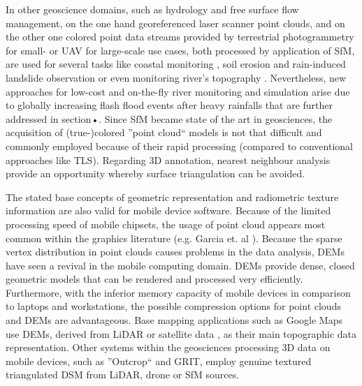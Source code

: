 \documentclass[review]{elsarticle}
\begin{document}
In other geoscience domains, such as hydrology and free surface flow management, on the one hand georeferenced laser scanner point clouds, and on the other one colored point data streams provided by terrestrial photogrammetry for small- or \gls{UAV} for large-scale use cases, both processed by application of \gls{SfM}, are used for several tasks like coastal monitoring \cite{Letortu2017, Medjkane2018}, soil erosion and rain-induced landslide observation or even monitoring river's topography \cite{Watanabe2016}. Nevertheless, new approaches for low-cost and on-the-fly river monitoring \cite{Kroehnert2017a} and simulation \cite{Leskens2015} arise due to globally increasing flash flood events after heavy rainfalls \cite{Mueller2011} that are further addressed in section{•}.
Since \gls{SfM} became state of the art in geosciences, the acquisition of (true-)colored ''point cloud`` models is not that difficult and commonly employed because of their rapid processing (compared to conventional approaches like \gls{TLS}). Regarding 3D annotation, nearest neighbour analysis provide an opportunity whereby surface triangulation can be avoided.








The stated base concepts of geometric representation and radiometric texture information are also valid for mobile device software. Because of the limited processing speed of mobile chipsets, the usage of point cloud appears most common within the graphics literature (e.g. Garcia et. al \cite{Garcia2015}). Because the sparse vertex distribution in point clouds causes problems in the data analysis, \glspl{DEM} have seen a revival in the mobile computing domain. \Glspl{DEM} provide dense, closed geometric models that can be rendered and processed very efficiently. Furthermore, with the inferior memory capacity of mobile devices in comparison to laptops and workstations, the possible compression options for point clouds and \glspl{DEM} are advantageous. Base mapping applications such as Google Maps use \glspl{DEM}, derived from \gls{LiDAR} or satellite data \cite{Farr2007}, as their main topographic data representation. Other systems within the geosciences processing 3D data on mobile devices, such as ''Outcrop`` and \gls{GRIT}, employ genuine textured triangulated \gls{DSM} from \gls{LiDAR}, drone or \gls{SfM} sources.
\end{document}
